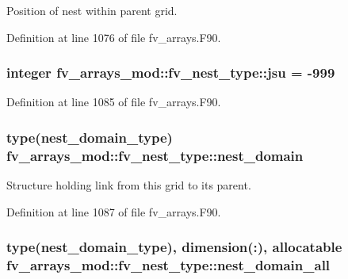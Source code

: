 Position of nest within parent grid. 



Definition at line 1076 of file fv\-\_\-arrays.\-F90.

\subsubsection[{jsu}]{\setlength{\rightskip}{0pt plus 5cm}integer fv\-\_\-arrays\-\_\-mod\-::fv\-\_\-nest\-\_\-type\-::jsu = -\/999}\label{structfv__arrays__mod_1_1fv__nest__type_a3ff9370e06722ce089be75bbe4ddc870}


Definition at line 1085 of file fv\-\_\-arrays.\-F90.

\subsubsection[{nest\-\_\-domain}]{\setlength{\rightskip}{0pt plus 5cm}type(nest\-\_\-domain\-\_\-type) fv\-\_\-arrays\-\_\-mod\-::fv\-\_\-nest\-\_\-type\-::nest\-\_\-domain}\label{structfv__arrays__mod_1_1fv__nest__type_a2f7e06880fd4717d1aec364d3de4a2d3}


Structure holding link from this grid to its parent. 



Definition at line 1087 of file fv\-\_\-arrays.\-F90.

\subsubsection[{nest\-\_\-domain\-\_\-all}]{\setlength{\rightskip}{0pt plus 5cm}type(nest\-\_\-domain\-\_\-type), dimension(\-:), allocatable fv\-\_\-arrays\-\_\-mod\-::fv\-\_\-nest\-\_\-type\-::nest\-\_\-domain\-\_\-all}\label{structfv__arrays__mod_1_1fv__nest__type_a4b80c11edd90aa8ba757f5d11d8031d1}


